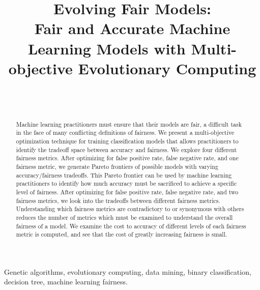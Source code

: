 \documentclass[twoside]{article}
\begin{document}
\title{\bf Evolving Fair Models: \\
Fair and Accurate Machine Learning Models with Multi-objective Evolutionary Computing}  

\author{ \hfill {}\\ 
\AND
        \hfill {}\\
}

\maketitle

\begin{abstract}

Machine learning practitioners must ensure that their models are fair, a difficult task in the face of many conflicting definitions of fairness. We present a multi-objective optimization technique for training classification models that allows practitioners to identify the tradeoff space between accuracy and fairness. We explore four different fairness metrics. After optimizing for false positive rate, false negative rate, and one fairness metric, we generate Pareto frontiers of possible models with varying accuracy/fairness tradeoffs. This Pareto frontier can be used by machine learning practitioners to identify how much accuracy must be sacrificed to achieve a specific level of fairness. After optimizing for false positive rate, false negative rate, and two fairness metrics, we look into the tradeoffs between different fairness metrics. Understanding which fairness metrics are contradictory to or synonymous with others reduces the number of metrics which must be examined to understand the overall fairness of a model. We examine the cost to accuracy of different levels of each fairness metric is computed, and see that the cost of greatly increasing fairness is small.
\end{abstract}

\begin{keywords}

Genetic algorithms, 
evolutionary computing,
data mining, 
binary classification, 
decision tree, 
machine learning fairness.

\end{keywords}
\end{document}
